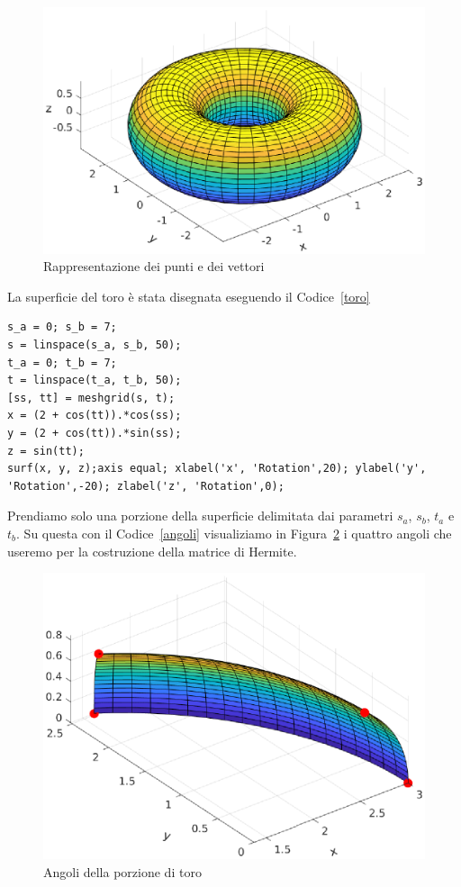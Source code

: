 \documentclass[12pt]{article}
\begin{document}
\begin{figure}[H]
    \centering

    \includegraphics[scale=0.7]{img/toro.eps}

    \caption{Rappresentazione dei punti e dei vettori}\label{fig:2}
\end{figure}

La superficie del toro è stata disegnata eseguendo il Codice~\ref{toro}
\begin{lstlisting}[caption={Plot del toro}, style=matlab, label={toro}, captionpos=b]
s_a = 0; s_b = 7;
s = linspace(s_a, s_b, 50);
t_a = 0; t_b = 7;
t = linspace(t_a, t_b, 50);
[ss, tt] = meshgrid(s, t);
x = (2 + cos(tt)).*cos(ss);
y = (2 + cos(tt)).*sin(ss);
z = sin(tt);
surf(x, y, z);axis equal; xlabel('x', 'Rotation',20); ylabel('y', 'Rotation',-20); zlabel('z', 'Rotation',0);
\end{lstlisting}
Prendiamo solo una porzione della superficie delimitata dai parametri $s_a$, $s_b$, $t_a$ e $t_b$.
Su questa con il Codice~\ref{angoli} visualiziamo in Figura~\ref{fig:3} i quattro angoli che useremo per la costruzione
della matrice di Hermite.

\begin{figure}[H]
    \centering

    \includegraphics[scale=0.7]{img/cornerPatch.eps}

    \caption{Angoli della porzione di toro}\label{fig:3}
\end{figure}
\end{document}
